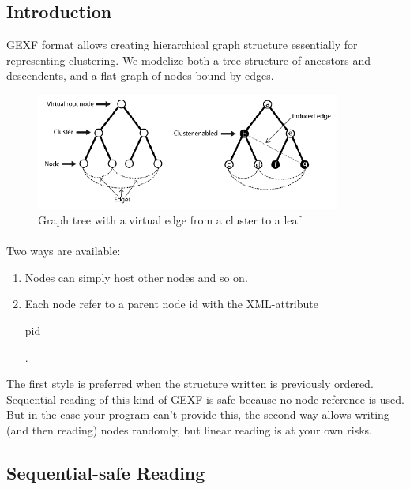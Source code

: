 \documentclass[a4paper,10pt]{article}
\begin{document}
\subsection{Introduction}

GEXF format allows creating hierarchical graph structure essentially for representing clustering. We modelize both a tree structure of ancestors and descendents, and a flat graph of nodes bound by edges.

\begin{figure}[!ht]
  \begin{center}
  \includegraphics[width=10cm,keepaspectratio=true]{res/hierarchy.png}
  \caption{Graph tree with a virtual edge from a cluster to a leaf}
  \end{center}
\end{figure}

\paragraph{}
Two ways are available:
\begin{enumerate}
 \item Nodes can simply host other nodes and so on.
 \item Each node refer to a parent node id with the XML-attribute \begin{footnotesize}pid\end{footnotesize}.
\end{enumerate}

The first style is preferred when the structure written is previously ordered. Sequential reading of this kind of GEXF is safe because no node reference is used. But in the case your program can't provide this, the second way allows writing (and then reading) nodes randomly, but linear reading is at your own risks.

\subsection{Sequential-safe Reading}
\end{document}
